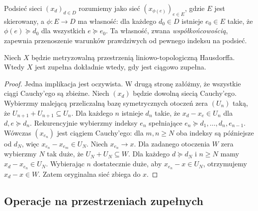 \begin{uwaga}[Podsieć]
Podsieć sieci $(x_d)_{d\in D}$ rozumiemy jako sieć
$(x_{\phi(e)})_{e\in E}$, gdzie $E$ jest skierowany,
a $\phi:E\to D$ ma własność: dla każdego $d_0\in D$
istnieje $e_0\in E$ takie, że $\phi(e)\succeq d_0$
dla wszystkich $e\succeq e_0$. Ta własność, zwana
\emph{współkońcowością}, zapewnia przenoszenie warunków
prawdziwych od pewnego indeksu na podsieć.
\end{uwaga}

\begin{twierdzenie}
\label{thm:metric-complete}
Niech $X$ będzie metryzowalną przestrzenią liniowo-topologiczną
Hausdorffa. Wtedy $X$ jest zupełna dokładnie wtedy,
gdy jest ciągowo zupełna.
\end{twierdzenie}
\begin{proof}
Jedna implikacja jest oczywista. W drugą stronę załóżmy,
że wszystkie ciągi Cauchy'ego są zbieżne. Niech $(x_d)$
będzie dowolną siecią Cauchy'ego. Wybierzmy malejącą
przeliczalną bazę symetrycznych otoczeń zera $(U_n)$
taką, że $U_{n+1}+U_{n+1}\subseteq U_n$.
Dla każdego $n$ istnieje $d_n$ takie, że
$x_d-x_e\in U_n$ dla $d,e\succeq d_n$.
Rekurencyjnie wybierzmy indeksy $e_n$ spełniające
$e_n\succeq d_1,\ldots,d_n,e_{n-1}$.
Wówczas $(x_{e_n})$ jest ciągiem Cauchy'ego: dla
$m,n\geq N$ oba indeksy są późniejsze od $d_N$,
więc $x_{e_n}-x_{e_m}\in U_N$.
Niech $x_{e_n}\to x$. Dla zadanego otoczenia $W$ zera
wybierzmy $N$ tak duże, że $U_N+U_N\subseteq W$.
Dla każdego $d\succeq d_N$ i $n\geq N$ mamy
$x_d-x_{e_n}\in U_N$. Wybierając $n$ dostatecznie duże,
aby $x_{e_n}-x\in U_N$, otrzymujemy $x_d-x\in W$.
Zatem oryginalna sieć zbiega do $x$.
\end{proof}

\subsection{Operacje na przestrzeniach zupełnych}

